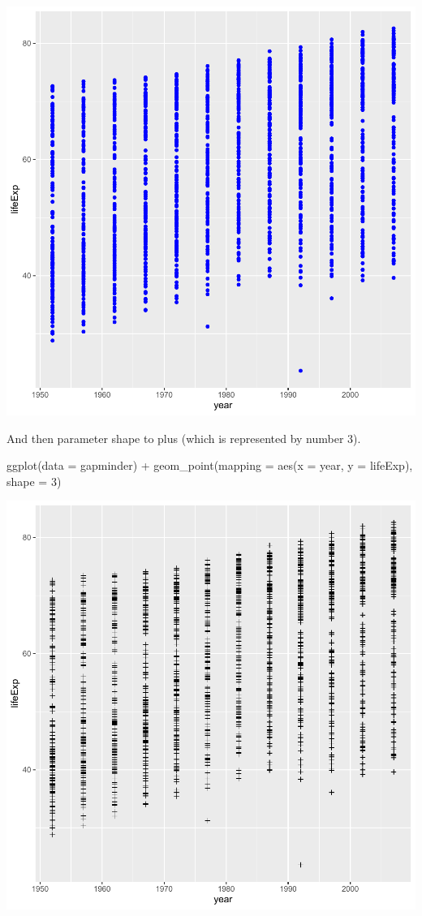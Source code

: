 \documentclass[
]{book}
\makeatletter
\newenvironment{Shaded}{\begin{snugshade}}{\end{snugshade}}
\newcommand{\AttributeTok}[1]{\textcolor[rgb]{0.61,0.61,0.61}{#1}}
\newcommand{\DecValTok}[1]{\textcolor[rgb]{0.06,0.06,0.06}{#1}}
\newcommand{\FunctionTok}[1]{\textcolor[rgb]{0,0,0}{#1}}
\newcommand{\NormalTok}[1]{#1}
\newcommand{\SpecialCharTok}[1]{\textcolor[rgb]{0,0,0}{#1}}
\newenvironment{kframe}{%
\medskip{}
\setlength{\fboxsep}{.8em}
 \def\at@end@of@kframe{}%
 \ifinner\ifhmode%
  \def\at@end@of@kframe{\end{minipage}}%
  \begin{minipage}{\columnwidth}%
 \fi\fi%
 \def\FrameCommand##1{\hskip\@totalleftmargin \hskip-\fboxsep
 \colorbox{shadecolor}{##1}\hskip-\fboxsep
     \hskip-\linewidth \hskip-\@totalleftmargin \hskip\columnwidth}%
 \MakeFramed {\advance\hsize-\width
   \@totalleftmargin\z@ \linewidth\hsize
   \@setminipage}}%
 {\par\unskip\endMakeFramed%
 \at@end@of@kframe}
\renewenvironment{Shaded}{\begin{kframe}}{\end{kframe}}
\makeatother
\begin{document}
\begin{center}\includegraphics[width=0.7\linewidth,keepaspectratio]{Multivariable_Data_Analysis_files/figure-latex/unnamed-chunk-21-1} \end{center}

And then parameter shape to plus (which is represented by number 3).

\begin{Shaded}
\begin{Highlighting}[]
\FunctionTok{ggplot}\NormalTok{(}\AttributeTok{data =}\NormalTok{ gapminder) }\SpecialCharTok{+}
  \FunctionTok{geom\_point}\NormalTok{(}\AttributeTok{mapping =} \FunctionTok{aes}\NormalTok{(}\AttributeTok{x =}\NormalTok{ year, }\AttributeTok{y =}\NormalTok{ lifeExp), }\AttributeTok{shape =} \DecValTok{3}\NormalTok{)}
\end{Highlighting}
\end{Shaded}

\begin{center}\includegraphics[width=0.7\linewidth,keepaspectratio]{Multivariable_Data_Analysis_files/figure-latex/unnamed-chunk-22-1} \end{center}
\end{document}
